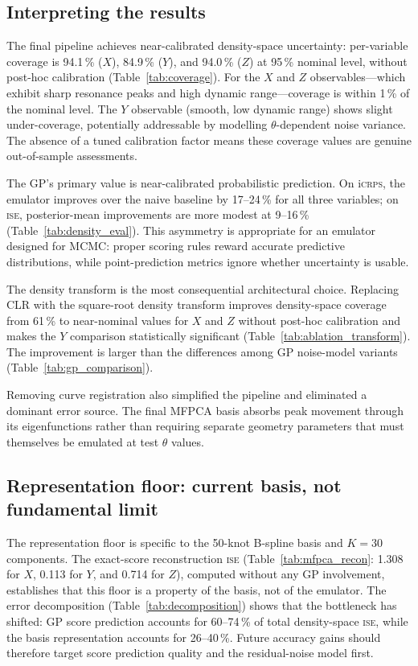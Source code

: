 \documentclass[12pt,a4paper]{article}
\newcommand{\ISE}{\textsc{ise}}
\newcommand{\iCRPS}{i\textsc{crps}}
\newcommand{\spar}{\theta}
\begin{document}
\subsection{Interpreting the results}
\label{sec:evidence}

The final pipeline achieves near-calibrated density-space uncertainty:
per-variable coverage is 94.1\,\% ($X$), 84.9\,\% ($Y$), and
94.0\,\% ($Z$) at 95\,\% nominal level, without post-hoc calibration
(Table~\ref{tab:coverage}).  For the $X$ and $Z$ observables---which
exhibit sharp resonance peaks and high dynamic range---coverage is
within 1\,\% of the nominal level.  The $Y$ observable (smooth, low
dynamic range) shows slight under-coverage, potentially addressable by
modelling $\spar$-dependent noise variance.  The absence of a tuned
calibration factor means these coverage values are genuine
out-of-sample assessments.

The GP's primary value is near-calibrated probabilistic prediction.
On \iCRPS, the emulator improves over the naive baseline by 17--24\,\%
for all three variables; on \ISE, posterior-mean improvements are more
modest at 9--16\,\% (Table~\ref{tab:density_eval}).  This asymmetry is
appropriate for an emulator designed for MCMC: proper scoring rules
reward accurate predictive distributions, while point-prediction
metrics ignore whether uncertainty is usable.

The density transform is the most consequential architectural choice.
Replacing CLR with the square-root density transform improves
density-space coverage from 61\,\% to near-nominal values for $X$ and
$Z$ without post-hoc calibration and makes the $Y$ comparison
statistically significant (Table~\ref{tab:ablation_transform}).
The improvement is larger than the differences among GP noise-model
variants (Table~\ref{tab:gp_comparison}).

Removing curve registration also simplified the pipeline and eliminated
a dominant error source.  The final MFPCA basis absorbs peak movement
through its eigenfunctions rather than requiring separate geometry
parameters that must themselves be emulated at test $\spar$ values.

\subsection{Representation floor: current basis, not fundamental limit}
\label{sec:discussion_floor}

The representation floor is specific to the 50-knot B-spline basis and
$K=30$ components.  The exact-score reconstruction \ISE
(Table~\ref{tab:mfpca_recon}: 1.308 for $X$, 0.113 for $Y$, and
0.714 for $Z$), computed without any GP involvement, establishes that
this floor is a property of the basis, not of the emulator.  The error
decomposition (Table~\ref{tab:decomposition}) shows that the bottleneck
has shifted: GP score prediction accounts for 60--74\,\% of total
density-space \ISE, while the basis representation accounts for
26--40\,\%.  Future accuracy gains should therefore target score
prediction quality and the residual-noise model first.
\end{document}
